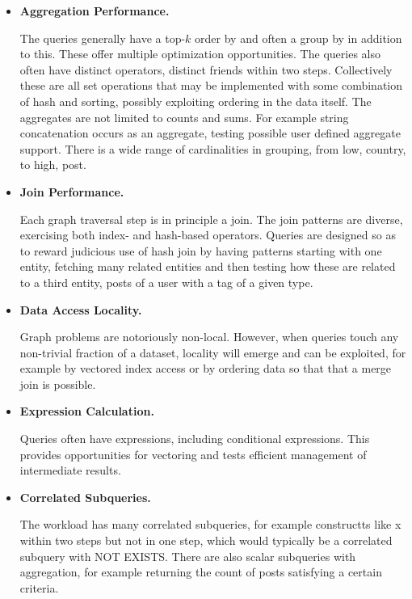 \begin{itemize}
    \item \textbf{Aggregation Performance.}

        The queries generally have a top-$k$ order by and often a group by in
        addition to this.  These offer multiple optimization opportunities.
        The queries also often have distinct operators, \ie distinct friends
        within two steps.  Collectively these are all set operations that may
        be implemented with some combination of hash and sorting, possibly
        exploiting ordering in the data itself.  The aggregates are not
        limited to counts and sums.  For example string concatenation occurs
        as an aggregate, testing possible user defined aggregate support.
        There is a wide range of cardinalities in grouping, from low, \eg country, to high, \eg post.

    \item \textbf{Join Performance.}

        Each graph traversal step is in principle a join.  The join patterns are
        diverse, exercising both index- and hash-based operators.   Queries are designed
        so as to reward judicious use of hash join by having patterns starting with one
        entity, fetching many related entities and then testing how these are related
        to a third entity, \eg posts of a user with a tag of a given type.

    \item \textbf{Data Access Locality.}

        Graph problems are notoriously non-local.  However, when queries touch
        any non-trivial fraction of a dataset, locality will emerge and can be
        exploited, for example by vectored index access or by ordering data so
        that that a merge join is possible.

    \item \textbf{Expression Calculation.}

        Queries often have expressions, including conditional expressions.
        This provides opportunities for vectoring and tests efficient
        management of intermediate results.

    \item \textbf{Correlated Subqueries.}

        The workload has many correlated subqueries, for example constructts
        like x within two steps but not in one step, which would typically be
        a correlated subquery with NOT EXISTS.  There are also scalar
        subqueries with aggregation, for example returning the count of posts
        satisfying a certain criteria.



\end{itemize}

